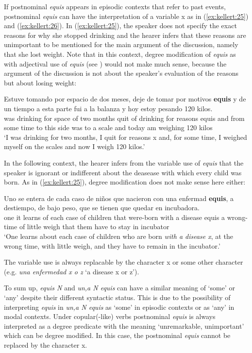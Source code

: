 \documentclass[output=paper]{langsci/langscibook}
\begin{document}
If postnominal \textit{equis} appears in episodic contexts that refer to past events, postnominal \textit{equis} can have the interpretation of a variable x as in (\ref{ex:kellert:25}) and (\ref{ex:kellert:26}). In (\ref{ex:kellert:25}), the speaker does not specify the exact reasons for why she stopped drinking and the hearer infers that these reasons are unimportant to be mentioned for the main argument of the discussion, namely that she lost weight. Note that in this context, degree modification of \textit{equis} as with adjectival use of \textit{equis} (see ) would not make much sense, because the argument of the discussion is not about the speaker's evaluation of the reasons but about losing weight:

\ea\label{ex:kellert:25}
\gll  Estuve tomando por espacio de dos meses, deje de tomar por motivos \textbf{equis} y de un tiempo a esta parte fui a la balanza y hoy estoy pesando 120 kilos.\\
was drinking for space of two months quit of drinking for reasons equis and from some time to this side was to a scale and today am weighing 120 kilos\\
\glt ‘I was drinking for two months, I quit for reasons x and, for some time, I weighed myself on the scales and now I weigh 120 kilos.’
\z

In the following context, the hearer infers from the variable use of \textit{equis} that the speaker is ignorant or indifferent about the deasease with which every child was born. As in (\ref{ex:kellert:25}), degree modification does not make sense here either:

\ea\label{ex:kellert:26}
\gll  Uno se entera de cada caso de niños que nacieron con una enfermad \textbf{equis}, a destiempo, de bajo peso, que se tienen que quedar en incubadora.\\
one it learns of each case of children that were-born with a disease equis a wrong-time of little weigh that them have to stay in incubator\\
\glt ‘One learns about each case of children who are born \textit{with a disease x}, at the wrong time, with little weigh, and they have to remain in the incubator.’
\z

The variable use is always replacable by the character x or some other character (e.g. \textit{una enfermedad x o z} ‘a disease x or z’).

To sum up, \textit{equis N} and \textit{un,a N equis} can have a similar meaning of ‘some’ or ‘any’ despite their different syntactic status. This is due to the possibility of interpreting \textit{equis} in \textit{un,a N equis} as ‘some’ in episodic contexts or as ‘any’ in modal contexts. Under copular(-like) verbs postnominal \textit{equis} is always interpreted as a degree predicate with the meaning ‘unremarkable, unimportant’ which can be degree modified. In this case, the postnominal \textit{equis} cannot be replaced by the character x.
\end{document}

